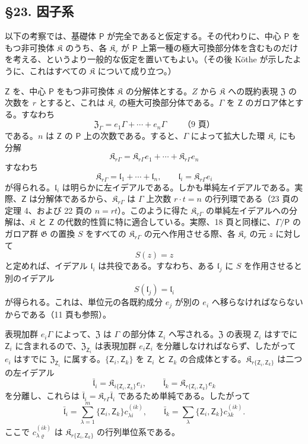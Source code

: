 \subsection*{\S 23. 因子系}\label{faktorensysteme}

以下の考察では、基礎体 \(\mathsf P\) が完全であると仮定する。その代わりに、中心 \(\mathsf P\) をもつ非可換体 \(\mathfrak K\) のうち、各 \(\mathfrak K_r\) が \(\mathsf P\) 上第一種の極大可換部分体を含むものだけを考える、というより一般的な仮定を置いてもよい。（その後 Köthe が示したように、これはすべての \(\mathfrak K\) について成り立つ。）

\(\mathsf{Z}\) を、中心 \(\mathsf P\) をもつ非可換体 \(\mathfrak K\) の分解体とする。\(Z\) から \(\mathfrak K\) への既約表現 \(\mathfrak Z\) の次数を \(r\) とすると、これは \(\mathfrak K_r\) の極大可換部分体である。\(\Gamma\) を \(\mathsf{Z}\) のガロア体とする。すなわち
\[
\mathfrak Z_\Gamma=e_1\Gamma+\cdots+e_n\Gamma
\qquad\text{（9 頁）}
\]
である。\(n\) は \(\mathsf{Z}\) の \(\mathsf P\) 上の次数である。すると、\(\Gamma\) によって拡大した環 \(\mathfrak K_r\) にも分解
\[
\mathfrak K_{r\Gamma}=\mathfrak K_{r\Gamma}e_1+\cdots+\mathfrak K_{r\Gamma}e_n
\]
すなわち
\[
\mathfrak K_{r\Gamma}=\mathfrak l_1+\cdots+\mathfrak l_n,\qquad
\mathfrak l_i=\mathfrak K_{r\Gamma}e_i
\]
が得られる。\(\mathfrak l_i\) は明らかに左イデアルである。しかも単純左イデアルである。実際、\(\mathsf{Z}\) は分解体であるから、\(\mathfrak K_{r\Gamma}\) は \(\Gamma\) 上次数 \(r\cdot t=n\) の行列環である（23 頁の定理 4、および 22 頁の \(n=rt\)）。このように得た \(\mathfrak K_{r\Gamma}\) の単純左イデアルへの分解は、\(\mathfrak K\) と \(\mathsf{Z}\) の代数的性質に特に適合している。実際、18 頁と同様に、\(\Gamma/\mathsf P\) のガロア群 \(\mathfrak G\) の置換 \(S\) をすべての \(\mathfrak K_{r\Gamma}\) の元へ作用させる際、各 \(\mathfrak K_r\) の元 \(z\) に対して
\[
S(z)=z
\]
と定めれば、イデアル \(\mathfrak l_i\) は共役である。すなわち、ある \(\mathfrak l_j\) に \(S\) を作用させると別のイデアル
\[
S(\mathfrak l_j)=\mathfrak l_i
\]
が得られる。これは、単位元の各既約成分 \(e_j\) が別の \(e_i\) へ移らなければならないからである（11 頁も参照）。

表現加群 \(e_i\Gamma\) によって、\(\mathfrak Z\) は \(\Gamma\) の部分体 \(\mathsf{Z}_i\) へ写される。\(\mathfrak Z\) の表現 \(\mathsf{Z}_i\) はすでに \(\mathsf{Z}_i\) に含まれるので、\(\mathfrak Z_{\mathsf{Z}_i}\) は表現加群 \(e_i\mathsf{Z}_i\) を分離しなければならず、したがって \(e_i\) はすでに \(\mathfrak Z_{\mathsf{Z}_i}\) に属する。\(\{\mathsf{Z}_i,\mathsf{Z}_k\}\) を \(\mathsf{Z}_i\) と \(\mathsf{Z}_k\) の合成体とする。\(\mathfrak K_{r\{\mathsf{Z}_i,\mathsf{Z}_k\}}\) は二つの左イデアル
\[
\bar{\mathfrak l}_i=\mathfrak K_{i\{\mathsf{Z}_i,\mathsf{Z}_k\}}e_i,\qquad
\bar{\mathfrak l}_k=\mathfrak K_{r\{\mathsf{Z}_i,\mathsf{Z}_k\}}e_k
\]
を分離し、これらは \(\bar{\mathfrak l}_i=\mathfrak K_{r\Gamma}\bar{\mathfrak l}_i\) であるため単純である。したがって
\[
\bar{\mathfrak l}_i=\sum_{\lambda=1}^m\{\mathsf{Z}_i,\mathsf{Z}_k\}c_{\lambda i}^{(ik)},\qquad
\bar{\mathfrak l}_k=\sum_{\lambda}\{\mathsf{Z}_i,\mathsf{Z}_k\}c_{\lambda k}^{(ik)}.
\]
ここで \(c_{\lambda\varrho}^{(ik)}\) は \(\mathfrak K_{r\{\mathsf{Z}_i,\mathsf{Z}_k\}}\) の行列単位系である。

